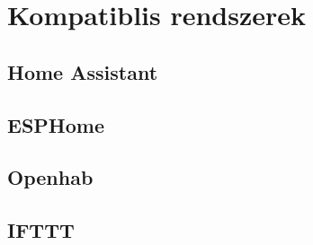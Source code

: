\chapter{Kompatiblis rendszerek}


\section{Home Assistant}

\section{ESPHome}

\section{Openhab}

\section{IFTTT}

